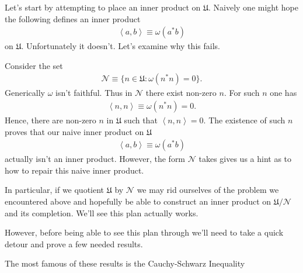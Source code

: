 Let's start by attempting to place an inner product on $\mathfrak{U}$. Naively one might hope the following defines an inner product
\begin{align}
    \left< a, b \right> \equiv \omega(a^*b)
\end{align}
on $\mathfrak{U}$. Unfortunately it doesn't. Let's examine why this fails.

Consider the set
\begin{align}
    \mathcal{N} \equiv \{ n \in \mathfrak{U} : \omega(n^*n) = 0 \}.
\end{align}
Generically $\omega$ isn't faithful. Thus in $\mathcal{N}$ there exist non-zero $n$. For such $n$ one has
\begin{align}
    \left< n, n \right> \equiv \omega(n^*n) = 0.
\end{align}
Hence, there are non-zero $n$ in $\mathfrak{U}$ such that $\left< n, n \right> = 0$. The existence of such $n$ proves that our naive inner product on $\mathfrak{U}$
\begin{align}
    \left< a, b \right> \equiv \omega(a^*b)
\end{align}
actually isn't an inner product. However, the form $\mathcal{N}$ takes gives us a hint as to how to repair this naive inner product.

In particular, if we quotient $\mathfrak{U}$ by $\mathcal{N}$ we may rid ourselves of the problem we encountered above and hopefully be able to construct an inner product on $\mathfrak{U} / \mathcal{N}$ and its completion. We'll see this plan actually works.

However, before being able to see this plan through we'll need to take a quick detour and prove a few needed results.

The most famous of these results is the Cauchy-Schwarz Inequality

